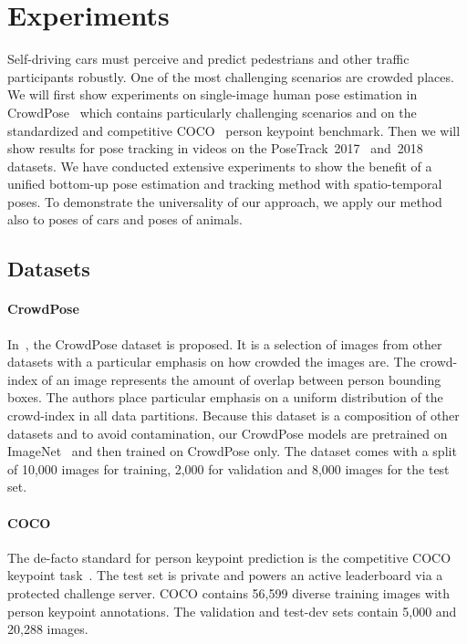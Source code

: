 \documentclass[journal]{IEEEtran}
\begin{document}
\section{Experiments}

Self-driving cars must perceive and predict pedestrians and other traffic
participants robustly.
One of the most challenging scenarios are crowded places.
We will first show experiments on single-image human pose estimation in
CrowdPose~\cite{li2019crowdpose} which contains particularly challenging
scenarios and on the standardized and competitive COCO~\cite{lin2014microsoft}
person keypoint benchmark. Then we will show results for pose tracking in videos
on the PoseTrack~2017~\cite{iqbal2017posetrack}
and~2018~\cite{andriluka2018posetrack} datasets.
We have conducted extensive experiments to show the benefit of a
unified bottom-up pose estimation and tracking method with spatio-temporal poses.
To demonstrate the universality of our approach, we apply our method also
to poses of cars and poses of animals.






\subsection{Datasets}

\paragraph{CrowdPose}
In~\cite{li2019crowdpose}, the CrowdPose dataset is proposed. It is a selection
of images from other datasets with a particular emphasis on how
crowded the images are. The crowd-index of an image represents the amount of
overlap between person bounding boxes. The authors place particular emphasis
on a uniform distribution of the crowd-index in all data partitions.
Because this dataset is a composition of other datasets and to avoid contamination,
our CrowdPose models are pretrained on ImageNet~\cite{deng2009imagenet} and
then trained on CrowdPose only.
The dataset comes with a split of 10,000 images for training, 2,000 for validation and
8,000 images for the test set.

\paragraph{COCO}
The de-facto standard for person keypoint prediction is the competitive COCO keypoint
task~\cite{lin2014microsoft}. The test set is private and powers an active
leaderboard via a protected challenge server.
COCO contains 56,599 diverse training images with person keypoint annotations.
The validation and test-dev sets contain 5,000 and 20,288 images.
\end{document}
